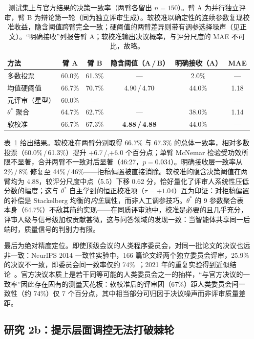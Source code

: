 \begin{table}[t]
\caption{测试集上与官方结果的决策一致率（两臂各留出 $n{=}150$）。臂 A 为并行独立评审，臂 B 为辩论第一轮（同为独立评审生成）。软校准以确定性的连续参数复现校准收益，隐含阈值跨臂完全一致；硬阈值的两臂差异则带有调参选择噪声（见正文）。``明确接收''列报告臂 A；软校准输出决议概率，与评分尺度的 MAE 不可比，故略。}
\label{tab:study2a}
\centering\small
\begin{tabular}{@{}lccccc@{}}
\toprule
方法 & 臂 A & 臂 B & 隐含阈值（A\,/\,B） & 明确接收（A） & MAE \\
\midrule
多数投票 & 60.0\% & 61.3\% & --- & 2.0\% & --- \\
均值硬阈值 & 66.7\% & 70.7\% & 4.90\,/\,4.70 & 44.0\% & 1.18 \\
元评审（星型） & 60.0\% & --- & --- & --- & --- \\
$\theta^*$ 聚合 & 64.7\% & 62.7\% & --- & 38.0\% & 1.14 \\
软校准 & 66.7\% & 67.3\% & \textbf{4.88\,/\,4.88} & 44.0\% & --- \\
\bottomrule
\end{tabular}
\end{table}

表~\ref{tab:study2a} 给出结果。软校准在两臂分别取得 66.7\% 与 67.3\% 的总体一致率，相对多数投票（60.0\%\,/\,61.3\%）提升 +6.7\,/,+6.0 个百分点；单臂 McNemar 检验受功效所限不显著，合并两臂不一致对后显著（46:27，$p{=}0.034$）。明确接收层一致率从 2\%\,/\,8\% 修复至 44\%\,/\,46\%——拒稿偏置被直接消除。软校准的隐含决策阈值在两臂均为 4.88，较评分尺度中点（5.5）下移 0.62 分，恰好量化了评审人系统性压低分数的幅度；这与 $\theta^*$ 自主学到的恒正校准项（$\tau{=}+1.04$）互为印证：对拒稿偏置的补偿是 Stackelberg 均衡的\emph{内生}属性，而非人工调参技巧。$\theta^*$ 的 9 参数聚合表本身（64.7\%）不敌其简约实现——在同质评审池中，校准是必要的且几乎充分，评审人级与信号级加权贡献甚微，这与问答领域的发现一致：当智能体共享同一后端时，质量信号的判别力有限。

最后为绝对精度定位。即使顶级会议的人类程序委员会，对同一批论文的决议也远非一致：NeurIPS 2014 一致性实验中，166 篇论文经两个独立委员会评审，25.9\% 的决议不一致，即委员会间一致率仅约 74\%~\cite{lawrence2014nips}；2021 年的重复实验得到近似结论~\cite{beygelzimer2021consistency}。官方决议本质上是若干同等可能的人类委员会之一的抽样，``与官方决议的一致率''因此存在固有的测量天花板：软校准后的评审团（67\%）距人类委员会间一致性（约 74\%）仅 7 个百分点，其中相当部分可归因于决议噪声而非评审质量差距。

\subsection{研究 2b：提示层面调控无法打破棘轮}
\label{sec:study2b}

